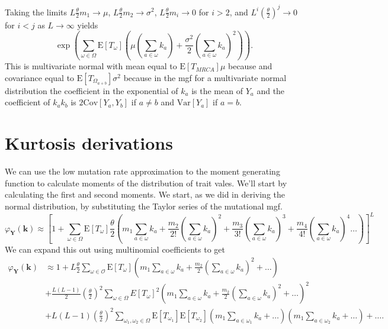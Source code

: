 \documentclass{article}
\newcommand{\T}{\frac{\theta}{2}}
\newcommand{\E}{\mathrm{E}}
\newcommand{\Var}{\mathrm{Var}}
\newcommand{\Cov}{\mathrm{Cov}}
\begin{document}
Taking the limits $L\T m_1 \to \mu$, $L\T m_2\to \sigma^2$, $L\T m_i\to 0$ for
$i>2$, and $L^i\left(\T\right)^j \to 0$ for $i<j$ as $L\to \infty$ yields
\begin{equation*}
  \label{eq:clt}
  \exp \left( \sum_{\omega \in \Omega}\E[T_{\omega}] \left( \mu \left(
  \sum_{a \in \omega} k_a\right) + \frac{\sigma^2}{2}\left( \sum_{a \in \omega}
  k_a\right)^2\right)\right).
\end{equation*}
This is multivariate normal with mean equal to $\E[T_{MRCA}]\mu$ because and
covariance equal to $\E[T_{\Omega_{a+b}}]\sigma^2$ because in the mgf for a
multivariate normal distribution the coefficient in the exponential of $k_a$ is
the mean of $Y_a$ and the coefficient of $k_ak_b$ is $2\Cov[Y_a,Y_b]$ if
$a\neq b$ and $\Var[Y_a]$ if $a=b$.
\section{Kurtosis derivations}
\label{kurt}
We can use the low mutation rate approximation to the moment generating function
to calculate moments of the distribution of trait vales. We'll start by
calculating the first and second moments. We start, as we did in deriving the
normal distribution, by substituting the Taylor series of the mutational mgf.
\begin{equation}
  \label{eq:mgf_approx_sub}
  \varphi_{\mathbf{Y}}(\mathbf{k}) \approx \left[ 1 + \sum_{\omega \in \Omega}
    \E[T_\omega] \T \left( m_1 \sum_{a \in \omega} k_a +
    \frac{m_2}{2!}\left( \sum_{a \in \omega} k_a\right)^2 +
    \frac{m_3}{3!}\left( \sum_{a \in \omega} k_a\right)^3 +
    \frac{m_4}{4!}\left( \sum_{a \in \omega} k_a\right)^4 \ldots \right) \right]^L
\end{equation}
We can expand this out using multinomial coefficients to get
\begin{align}
  \label{eq:mgf_approx_expand}
  \varphi_{\mathbf{Y}}(\mathbf{k}) &\approx 1 +
  L\T \sum_{\omega \in \mathcal{O}} \E[T_{\omega}]\left( m_1 \sum_{a \in \omega} k_a +
  \frac{m_2}{2}\left( \sum_{a \in \omega} k_a\right)^2 + \ldots \right) \nonumber \\
  &+ \frac{L(L-1)}{2} \left(\T\right)^2 \sum_{\omega \in \Omega} E[T_{\omega}]^2
  \left( m_1 \sum_{a \in \omega} k_a +
  \frac{m_2}{2}\left( \sum_{a \in \omega} k_a\right)^2 + \ldots \right)^2 \nonumber \\
  &+ L(L-1)\left(\T\right)^2\sum_{\omega_1, \omega_2 \in \Omega}\E[T_{\omega_1}]\E[T_{\omega_2}]
  \left( m_1 \sum_{a \in \omega_1} k_a + \ldots \right)
  \left( m_1 \sum_{a \in \omega_2} k_a + \ldots \right) + \ldots.
\end{align}
\end{document}
